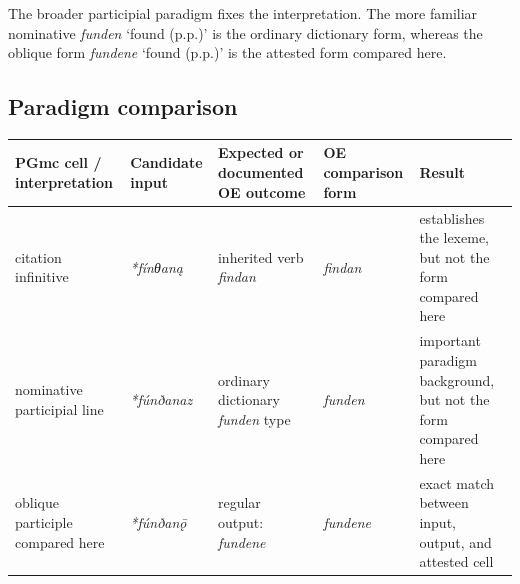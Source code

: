 \documentclass[
  british,
  a4paper,
  openany]{book}
\newcounter{none} %
\begin{document}
The broader participial paradigm fixes the interpretation. The more
familiar nominative {\emph{funden}} `found (p.p.)' is the ordinary
dictionary form, whereas the oblique form {\emph{fundene}} `found
(p.p.)' is the attested form compared here.

\subsection{Paradigm comparison}\label{paradigm-comparison-4}

{\def\LTcaptype{none} %
\begin{longtable}[]{@{}
  >{\raggedright\arraybackslash}p{}
  >{\raggedright\arraybackslash}p{}
  >{\raggedright\arraybackslash}p{}
  >{\raggedright\arraybackslash}p{}
  >{\raggedright\arraybackslash}p{}@{}}
\toprule\noalign{}
\begin{minipage}[b]{\linewidth}\raggedright
PGmc cell / interpretation
\end{minipage} & \begin{minipage}[b]{\linewidth}\raggedright
Candidate input
\end{minipage} & \begin{minipage}[b]{\linewidth}\raggedright
Expected or documented OE outcome
\end{minipage} & \begin{minipage}[b]{\linewidth}\raggedright
OE comparison form
\end{minipage} & \begin{minipage}[b]{\linewidth}\raggedright
Result
\end{minipage} \\
\midrule\noalign{}
\endhead
\bottomrule\noalign{}
\endlastfoot
citation infinitive & {\emph{*fínθaną}} & inherited verb {\emph{findan}}
& {\emph{findan}} & establishes the lexeme, but not the form compared
here \\
nominative participial line & {\emph{*fúnðanaz}} & ordinary dictionary
{\emph{funden}} type & {\emph{funden}} & important paradigm background,
but not the form compared here \\
oblique participle compared here & {\emph{*fúnðanǭ}} & regular output:
{\emph{fundene}} & {\emph{fundene}} & exact match between input, output,
and attested cell \\
\end{longtable}
}
\end{document}
